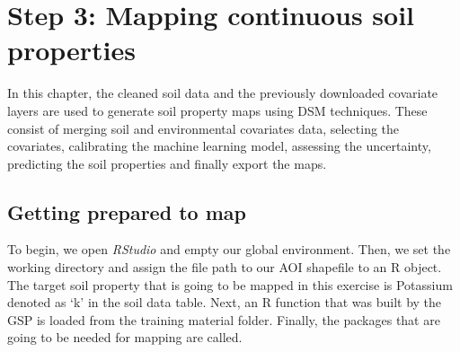 \documentclass[
  10pt,
  b5paper,
  oneside]{book}
\newenvironment{Shaded}{\begin{snugshade}}{\end{snugshade}}
\newcommand{\AttributeTok}[1]{\textcolor[rgb]{0.77,0.63,0.00}{#1}}
\newcommand{\CommentTok}[1]{\textcolor[rgb]{0.56,0.35,0.01}{\textit{#1}}}
\newcommand{\FloatTok}[1]{\textcolor[rgb]{0.00,0.00,0.81}{#1}}
\newcommand{\FunctionTok}[1]{\textcolor[rgb]{0.00,0.00,0.00}{#1}}
\newcommand{\NormalTok}[1]{#1}
\newcommand{\OtherTok}[1]{\textcolor[rgb]{0.56,0.35,0.01}{#1}}
\newcommand{\SpecialCharTok}[1]{\textcolor[rgb]{0.00,0.00,0.00}{#1}}
\newcommand{\StringTok}[1]{\textcolor[rgb]{0.31,0.60,0.02}{#1}}
\begin{document}
\begin{Shaded}
\end{Shaded}

\hypertarget{step-3-mapping-continuous-soil-properties}{%
\chapter{Step 3: Mapping continuous soil properties}\label{step-3-mapping-continuous-soil-properties}}

In this chapter, the cleaned soil data and the previously downloaded covariate layers are used to generate soil property maps using DSM techniques. These consist of merging soil and environmental covariates data, selecting the covariates, calibrating the machine learning model, assessing the uncertainty, predicting the soil properties and finally export the maps.

\hypertarget{getting-prepared-to-map}{%
\section{Getting prepared to map}\label{getting-prepared-to-map}}

To begin, we open \emph{RStudio} and empty our global environment. Then, we set the working directory and assign the file path to our AOI shapefile to an R object. The target soil property that is going to be mapped in this exercise is Potassium denoted as `k' in the soil data table. Next, an R function that was built by the GSP is loaded from the training material folder. Finally, the packages that are going to be needed for mapping are called.
\end{document}
